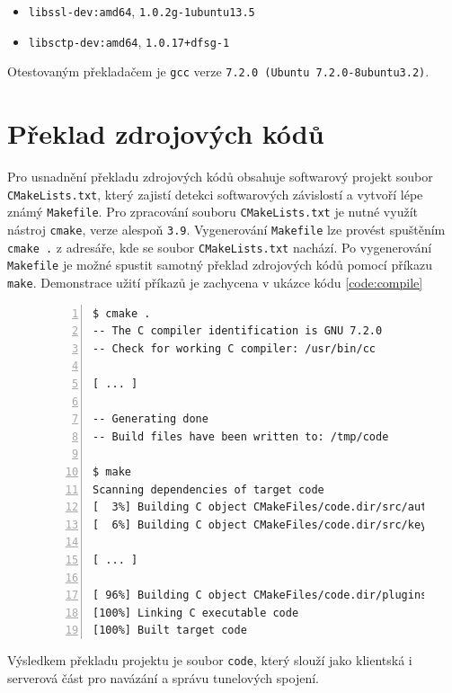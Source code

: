 \documentclass[thesis=M,czech]{FITthesis}[2012/10/20]
\begin{document}
\begin{itemize}
  \item \texttt{libssl-dev:amd64}, \texttt{1.0.2g-1ubuntu13.5}
 \item \texttt{libsctp-dev:amd64}, \texttt{1.0.17+dfsg-1}
\end{itemize}

Otestovaným překladačem je \texttt{gcc} verze \texttt{7.2.0 (Ubuntu 7.2.0-8ubuntu3.2)}.

\section{Překlad zdrojových kódů}

Pro usnadnění překladu zdrojových kódů obsahuje softwarový projekt soubor \texttt{CMakeLists.txt}, který zajistí detekci softwarových závislostí a vytvoří lépe známý \texttt{Makefile}. Pro zpracování souboru \texttt{CMakeLists.txt} je nutné využít nástroj \texttt{cmake}, verze alespoň \texttt{3.9}. Vygenerování \texttt{Makefile} lze provést spuštěním \texttt{cmake .} z adresáře, kde se soubor \texttt{CMakeLists.txt} nachází. Po vygenerování \texttt{Makefile} je možné spustit samotný překlad zdrojových kódů pomocí příkazu \texttt{make}. Demonstrace užití příkazů je zachycena v ukázce kódu \ref{code:compile}

\begin{figure}[h]
	\begin{lstlisting}[label=code:compile,caption=Ukázka překladu zdrojových kódů aplikace,frame=single,numbers=left]
$ cmake .
-- The C compiler identification is GNU 7.2.0
-- Check for working C compiler: /usr/bin/cc

[ ... ]

-- Generating done
-- Build files have been written to: /tmp/code

$ make
Scanning dependencies of target code
[  3%] Building C object CMakeFiles/code.dir/src/auth.c.o
[  6%] Building C object CMakeFiles/code.dir/src/keyfile.c.o

[ ... ]

[ 96%] Building C object CMakeFiles/code.dir/plugins/udp/udp.c.o
[100%] Linking C executable code
[100%] Built target code
      \end{lstlisting}
    \end{figure}

    Výsledkem překladu projektu je soubor \texttt{code}, který slouží jako klientská i serverová část pro navázání a správu tunelových spojení.
    
\end{document}
